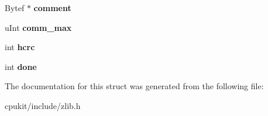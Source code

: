 \begin{DoxyCompactItemize}
Bytef $\ast$ {\bfseries comment}
\item 
\mbox{\label{structgz__header__s_aa0529f45e5c08b3009cfc2a61a86aea0}} 
u\+Int {\bfseries comm\+\_\+max}
\item 
\mbox{\label{structgz__header__s_a29fa8de3acff8d8c7bad61dc924d8564}} 
int {\bfseries hcrc}
\item 
\mbox{\label{structgz__header__s_ab8fd11f59b76a7d031e24bede8679d9d}} 
int {\bfseries done}
\end{DoxyCompactItemize}


The documentation for this struct was generated from the following file\+:\begin{DoxyCompactItemize}
\item 
cpukit/include/zlib.\+h\end{DoxyCompactItemize}
